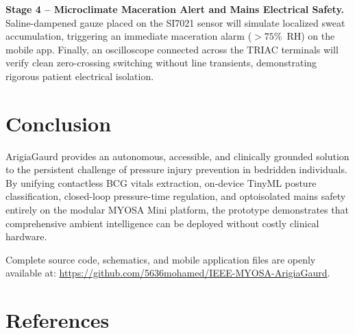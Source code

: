 ﻿\documentclass[11pt,a4paper]{article}
\begin{document}
\noindent \textbf{Stage 4 -- Microclimate Maceration Alert and Mains Electrical Safety.} Saline-dampened gauze placed on the SI7021 sensor will simulate localized sweat accumulation, triggering an immediate maceration alarm ($>75\%$~RH) on the mobile app. Finally, an oscilloscope connected across the TRIAC terminals will verify clean zero-crossing switching without line transients, demonstrating rigorous patient electrical isolation.

\section{Conclusion}
ArigiaGaurd provides an autonomous, accessible, and clinically grounded solution to the persistent challenge of pressure injury prevention in bedridden individuals. By unifying contactless BCG vitals extraction, on-device TinyML posture classification, closed-loop pressure-time regulation, and optoisolated mains safety entirely on the modular MYOSA Mini platform, the prototype demonstrates that comprehensive ambient intelligence can be deployed without costly clinical hardware.

\vspace{0.06em}
\noindent Complete source code, schematics, and mobile application files are openly available at: \url{https://github.com/5636mohamed/IEEE-MYOSA-ArigiaGaurd}.

\vspace{0.12em}
\section*{References}
\vspace{-0.25em}
\end{document}
